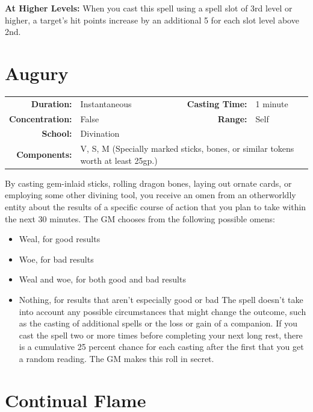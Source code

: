 \documentclass[12pt,showtrims]{memoir}
\begin{document}
\vspace{8pt} \noindent\textbf{At Higher Levels:} When you cast this spell using a spell slot of 3rd level or higher, a target's hit points increase by an additional 5 for each slot level above 2nd.
\newpage
\section*{Augury}

{
\small\centering\vspace{-6pt}
\begin{tabular}{rlrl}
\toprule

\textbf{Duration:} & Instantaneous &
\textbf{Casting Time:} & 1 minute \\
\textbf{Concentration:} & False &
\textbf{Range:} & Self \\
\textbf{School:} & Divination \\
\textbf{Components:} & \multicolumn{3}{p{0.7\textwidth}}{V, S, M (Specially marked sticks, bones, or similar tokens worth at least 25gp.)}\\

\bottomrule
\end{tabular}
}

\vspace{1\baselineskip}\noindent By casting gem-inlaid sticks, rolling dragon bones, laying out ornate cards, or employing some other divining tool, you receive an omen from an otherworldly entity about the results of a specific course of action that you plan to take within the next 30 minutes. The GM chooses from the following possible omens:
\begin{itemize}
    \item Weal, for good results
    \item Woe, for bad results
    \item Weal and woe, for both good and bad results
    \item Nothing, for results that aren't especially good or bad The spell doesn't take into account any possible circumstances that might change the outcome, such as the casting of additional spells or the loss or gain of a companion. If you cast the spell two or more times before completing your next long rest, there is a cumulative 25 percent chance for each casting after the first that you get a random reading. The GM makes this roll in secret.
\end{itemize}


\newpage
\section*{Continual Flame}
\end{document}
